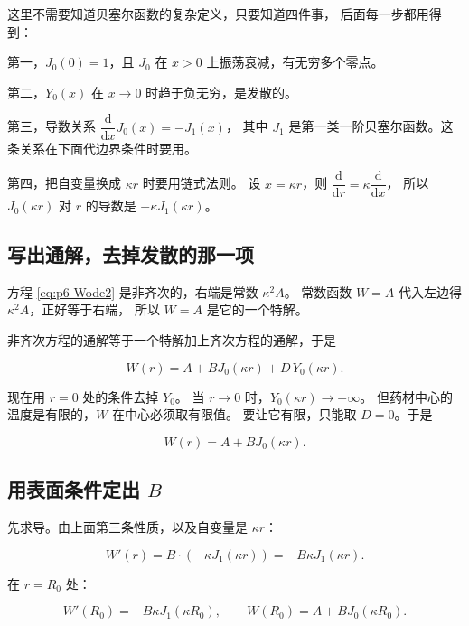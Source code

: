 这里不需要知道贝塞尔函数的复杂定义，只要知道四件事，
后面每一步都用得到：

第一，$J_0(0)=1$，且 $J_0$ 在 $x>0$ 上振荡衰减，有无穷多个零点。

第二，$Y_0(x)$ 在 $x\to0$ 时趋于负无穷，是发散的。

第三，导数关系
$\dfrac{\mathrm{d}}{\mathrm{d}x}J_0(x)=-J_1(x)$，
其中 $J_1$ 是第一类一阶贝塞尔函数。这条关系在下面代边界条件时要用。

第四，把自变量换成 $\kappa r$ 时要用链式法则。
设 $x=\kappa r$，则 $\dfrac{\mathrm{d}}{\mathrm{d}r}=\kappa\dfrac{\mathrm{d}}{\mathrm{d}x}$，
所以 $J_0(\kappa r)$ 对 $r$ 的导数是 $-\kappa J_1(\kappa r)$。

\subsection{写出通解，去掉发散的那一项}

方程 \eqref{eq:p6-Wode2} 是非齐次的，右端是常数 $\kappa^2A$。
常数函数 $W=A$ 代入左边得 $\kappa^2A$，正好等于右端，
所以 $W=A$ 是它的一个特解。

非齐次方程的通解等于一个特解加上齐次方程的通解，于是

\begin{equation}
W(r)=A+B J_0(\kappa r)+D\,Y_0(\kappa r).
\end{equation}

现在用 $r=0$ 处的条件去掉 $Y_0$。
当 $r\to0$ 时，$Y_0(\kappa r)\to-\infty$。
但药材中心的温度是有限的，$W$ 在中心必须取有限值。
要让它有限，只能取 $D=0$。于是

\begin{equation}
W(r)=A+B J_0(\kappa r).
\label{eq:p6-Wform}
\end{equation}

\subsection{用表面条件定出 $B$}

先求导。由上面第三条性质，以及自变量是 $\kappa r$：

\begin{equation}
W'(r)=B\cdot\left(-\kappa J_1(\kappa r)\right)=-B\kappa J_1(\kappa r).
\end{equation}

在 $r=R_0$ 处：

\begin{equation}
W'(R_0)=-B\kappa J_1(\kappa R_0),
\qquad
W(R_0)=A+B J_0(\kappa R_0).
\end{equation}

